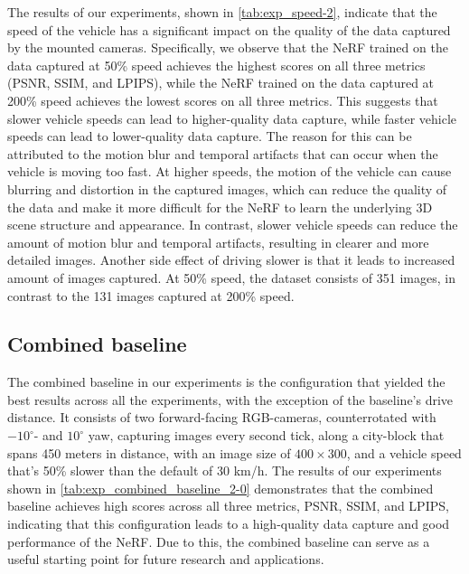 The results of our experiments, shown in \autoref{tab:exp_speed-2}, indicate that the speed of the vehicle has a significant impact on the quality of the data captured by the mounted cameras. Specifically, we observe that the NeRF trained on the data captured at 50\% speed achieves the highest scores on all three metrics (PSNR, SSIM, and LPIPS), while the NeRF trained on the data captured at 200\% speed achieves the lowest scores on all three metrics. This suggests that slower vehicle speeds can lead to higher-quality data capture, while faster vehicle speeds can lead to lower-quality data capture. The reason for this can be attributed to the motion blur and temporal artifacts that can occur when the vehicle is moving too fast. At higher speeds, the motion of the vehicle can cause blurring and distortion in the captured images, which can reduce the quality of the data and make it more difficult for the NeRF to learn the underlying 3D scene structure and appearance. In contrast, slower vehicle speeds can reduce the amount of motion blur and temporal artifacts, resulting in clearer and more detailed images. Another side effect of driving slower is that it leads to increased amount of images captured. At 50\% speed, the dataset consists of 351 images, in contrast to the 131 images captured at 200\% speed.














































\subsection{Combined baseline}
The combined baseline in our experiments is the configuration that yielded the best results across all the experiments, with the exception of the baseline's drive distance. It consists of two forward-facing RGB-cameras, counterrotated with $-10^\circ$- and $10^\circ$ yaw, capturing images every second tick, along a city-block that spans 450 meters in distance, with an image size of $400 \times 300$, and a vehicle speed that's 50\% slower than the default of 30 km/h. The results of our experiments shown in \autoref{tab:exp_combined_baseline_2-0} demonstrates that the combined baseline achieves high scores across all three metrics, PSNR, SSIM, and LPIPS, indicating that this configuration leads to a high-quality data capture and good performance of the NeRF. Due to this, the combined baseline can serve as a useful starting point for future research and applications.

